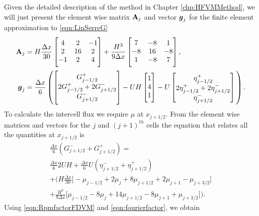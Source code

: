 Given the detailed description of the method in Chapter \ref{chp:HFVMMethod}, we will just present the element wise matrix $\mathbf{A}_j$ and vector $\boldsymbol{g}_j$ for the finite element approximation to \eqref{eqn:LinSerreG} 
\begin{align*}
\matr{A}_j &= H \frac{\Delta x}{30 } \begin{bmatrix} \TM 4 &2 &-1 \\2 &16 &2  \\-1 &2 &4 \BM \end{bmatrix} +  \frac{H^3 }{9\Delta x}\begin{bmatrix} \TM 7 &-8 &1  \\-8 &16 &-8  \\1 &-8 &7 \BM \end{bmatrix}, \\
\vecn{g}_j &=  \frac{\Delta x}{6} \left(\begin{bmatrix} \TM G^+_{j -1/2} \\2 G^+_{j -1/2}+2 G^-_{j +1/2} \\ G^-_{j +1/2} \BM \end{bmatrix} - UH\begin{bmatrix} \TM 1 \\4 \\ 1  \BM\end{bmatrix} - U\begin{bmatrix} \TM \eta^+_{j -1/2} \\2 \eta^+_{j -1/2}+2 \eta^-_{j +1/2} \\ \eta^-_{j +1/2} \end{bmatrix} \BM \right).
\end{align*}
To calculate the intercell flux we require $\mu$ at $x_{j+1/2}$. From the element wise matrices and vectors for the $j$ and $\left(j+1\right)^{th}$ cells the equation that relates all the quantities at $x_{j+1/2}$ is
\begin{multline*}
\frac{\Delta x}{6} \left(G^-_{j +1/2} + G^+_{j +1/2} \right)= \\
\frac{\Delta x}{6} 2UH   + \frac{\Delta x}{6} U \left(\eta^-_{j +1/2} + \eta^+_{j +1/2} \right) \\ +   \Bigg(H\frac{\Delta x}{30} \Bigg[ -\mu_{j-1/2} +  2\mu_{j} + 8\mu_{j+1/2}  +  2 \mu_{j+1}  - \mu_{j+3/2}\Bigg]   \\ + \frac{H^3 }{9\Delta x} \Bigg[  \mu_{j-1/2} -8\mu_{j} + 14 \mu_{j+1/2} -8\mu_{j+1} + \mu_{j+3/2}  \Bigg]    \Bigg).
\end{multline*}
Using \eqref{eqn:RpmfactorFDVM} and \eqref{eqn:fourierfactor}, we obtain
